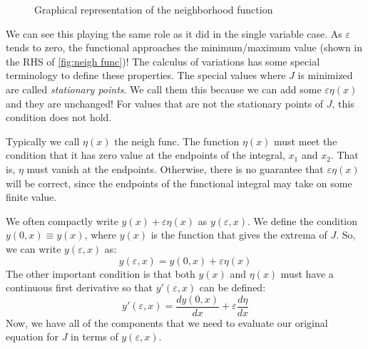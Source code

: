 \begin{figure}[ht]
\begin{tikzpicture}[x=0.75pt,y=0.75pt,yscale=-1,xscale=1]
\end{tikzpicture}
    \caption{Graphical representation of the neighborhood function}
    \label{fig:neigh func}
\end{figure}

We can see this playing the same role as it did in the single variable case. As $\varepsilon$ tends to zero, the functional approaches the minimum/maximum value (shown in the RHS of \autoref{fig:neigh func})! The calculus of variations has some special terminology to define these properties. The special values where $J$ is minimized are called \textit{stationary points}. We call them this because we can add some $\varepsilon\eta(x)$ and they are unchanged! For values that are not the stationary points of $J$, this condition does not hold.

Typically we call $\eta(x)$ the \gls{neigh func}. The function $\eta(x)$ must meet the condition that it has zero value at the endpoints of the integral, $x_1$ and $x_2$. That is, $\eta$ must vanish at the endpoints. Otherwise, there is no guarantee that $\varepsilon\eta(x)$ will be correct, since the endpoints of the functional integral may take on some finite value. 

We often compactly write $y(x)+\varepsilon\eta(x)$ as $y(\varepsilon,x)$. We define the condition $y(0,x)\equiv y(x)$, where $y(x)$ is the function that gives the extrema of $J$. So, we can write $y(\varepsilon,x)$ as:
\begin{equation}\label{eq:y epsilon}
    y(\varepsilon,x)=y(0,x)+\varepsilon\eta(x)
\end{equation}
The other important condition is that both $y(x)$ and $\eta(x)$ must have a continuous first derivative so that $y'(\varepsilon,x)$ can be defined:
\begin{equation}\label{eq:y prime epsilon}
    y'(\varepsilon,x)=\frac{dy(0,x)}{dx}+\varepsilon\frac{d\eta}{dx}
\end{equation}
Now, we have all of the components that we need to evaluate our original equation for $J$ in terms of $y(\varepsilon,x)$.

